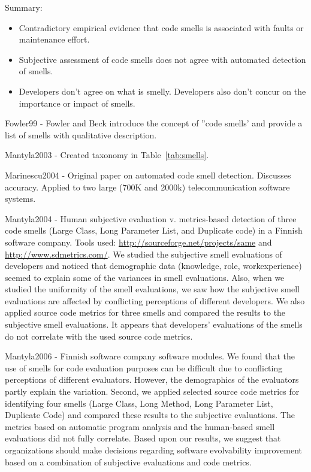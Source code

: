 \documentclass{article}
\begin{document}
Summary:
\begin{itemize}
\item Contradictory empirical evidence that code smells is associated with faults or maintenance effort.
\item Subjective assessment of code smells does not agree with automated detection of smells.
\item Developers don't agree on what is smelly. Developers also don't concur on the importance or impact of smells.
\end{itemize}


Fowler99 - Fowler and Beck introduce the concept of ''code smells' and provide a list of smells with qualitative description.\cite{Fowler99}

Mantyla2003 - Created taxonomy in Table~\ref{tab:smells}. \cite{Mantyla2003}

Marinescu2004 - Original paper on automated code smell detection. Discusses accuracy. Applied to two large (700K and 2000k) telecommunication software systems.\cite{Marinescu2004}

Mantyla2004 - Human subjective evaluation v. metrics-based detection of three code smells (Large Class, Long Parameter List, and Duplicate code) in a Finnish software company. Tools used: \url{http://sourceforge.net/projects/same} and \url{http://www.sdmetrics.com/}. We studied the subjective smell evaluations of developers and noticed that demographic data (knowledge, role, workexperience) seemed to explain some of the variances in smell evaluations. Also, when we studied the uniformity of the smell evaluations, we saw how the subjective smell evaluations are affected by conflicting perceptions of different developers. We also applied source code metrics for three smells and compared the results to the subjective smell evaluations. It appears that developers’ evaluations of the smells do not correlate with the used source code metrics.\cite{Mantyla2004}

Mantyla2006 - Finnish software company software modules. We found that the use of smells for code evaluation purposes can be difficult due to conflicting perceptions of different evaluators. However, the demographics of the evaluators partly explain the variation. Second, we applied selected source code metrics for identifying four smells (Large Class, Long Method, Long Parameter List, Duplicate Code) and compared these results to the subjective evaluations. The metrics based on automatic program analysis and the human-based smell evaluations did not fully correlate. Based upon our results, we suggest that organizations should make decisions regarding software evolvability improvement based on a combination of subjective evaluations and code metrics.\cite{Mantyla2006}
\end{document}
